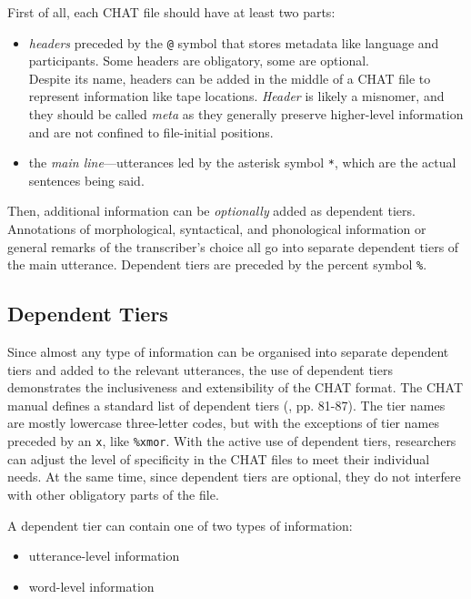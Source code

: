 First of all, each CHAT file should have at least two parts:
\begin{itemize}
	\item \emph{headers} preceded by the \texttt{@} symbol that stores metadata like language and participants. Some headers are obligatory, some are optional.\\
	Despite its name, headers can be added in the middle of a CHAT file to represent information like tape locations. \emph{Header} is likely a misnomer, and they should be called \emph{meta} as they generally preserve higher-level information and are not confined to file-initial positions.
	\item the \emph{main line}---utterances led by the asterisk symbol \texttt{*}, which are the actual sentences being said.
\end{itemize}

Then, additional information can be \emph{optionally} added as dependent tiers. Annotations of morphological, syntactical, and phonological information or general remarks of the transcriber's choice all go into separate dependent tiers of the main utterance. Dependent tiers are preceded by the percent symbol \texttt{\%}.

\subsection{Dependent Tiers}
Since almost any type of information can be organised into separate dependent tiers and added to the relevant utterances, the use of dependent tiers demonstrates the inclusiveness and extensibility of the CHAT format. The CHAT manual defines a standard list of dependent tiers (\cite{Macwhinney2000}, pp. 81-87). The tier names are mostly lowercase three-letter codes, but with the exceptions of tier names preceded by an \texttt{x}, like \texttt{\%xmor}. With the active use of dependent tiers, researchers can adjust the level of specificity in the CHAT files to meet their individual needs. At the same time, since dependent tiers are optional, they do not interfere with other obligatory parts of the file.

A dependent tier can contain one of two types of information:
\begin{itemize}
	\item utterance-level information
	\item word-level information
\end{itemize}

